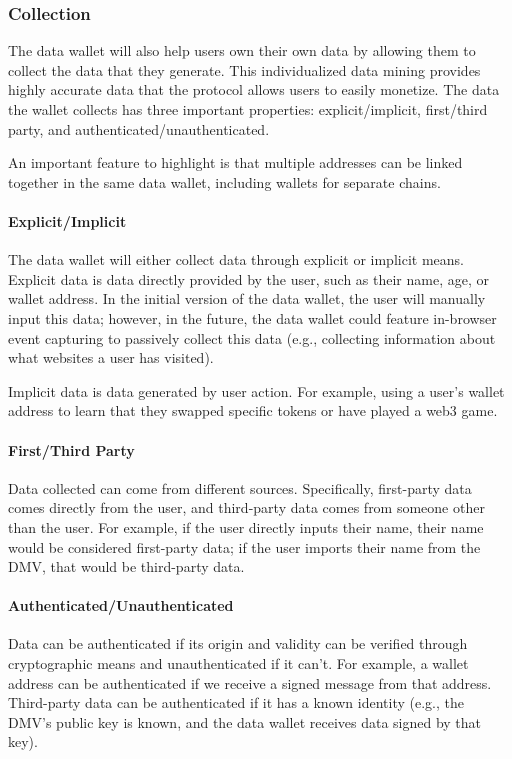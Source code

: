 \subsubsection{Collection}
The data wallet will also help users own their own data by allowing them to collect the data that they generate. This individualized data mining 
provides highly accurate data that the protocol allows users to easily monetize. The data the wallet collects has three important properties: 
explicit/implicit, first/third party, and authenticated/unauthenticated. %

An important feature to highlight is that multiple addresses can be linked together in the same data wallet, including wallets for separate chains. 

\paragraph{Explicit/Implicit}
The data wallet will either collect data through explicit or implicit means. Explicit data is data directly provided by the user, such as their name, 
age, or wallet address. In the initial version of the data wallet, the user will manually input this data; however, in the future, the data wallet 
could feature in-browser event capturing to passively collect this data (e.g., collecting information about what websites a user has visited).


Implicit data is data generated by user action. For example, using a user's wallet address to learn that they swapped specific tokens or have played a web3 game. 


\paragraph{First/Third Party}
Data collected can come from different sources. Specifically, first-party data comes directly from the user, and third-party data comes from 
someone other than the user. For example, if the user directly inputs their name, their name would be considered first-party data; if the 
user imports their name from the DMV, that would be third-party data.


\paragraph{Authenticated/Unauthenticated}
Data can be authenticated if its origin and validity can be verified through cryptographic means and unauthenticated if it can't. For example, 
a wallet address can be authenticated if we receive a signed message from that address. Third-party data can be authenticated if it has a known 
identity (e.g., the DMV's public key is known, and the data wallet receives data signed by that key). 

